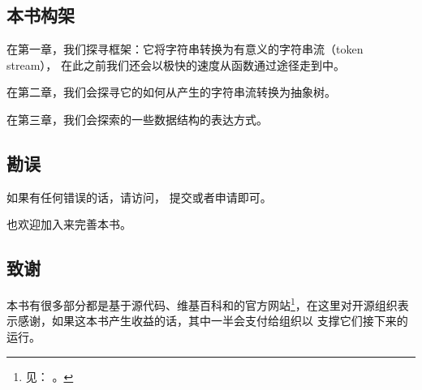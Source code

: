 \subsection*{本书构架}

在第一章，我们探寻框架：它将字符串转换为有意义的字符串流（token stream），
在此之前我们还会以极快的速度从函数通过途径走到中。

在第二章，我们会探寻它的如何从产生的字符串流转换为抽象树。

在第三章，我们会探索的一些数据结构的表达方式。


\subsection*{勘误}

如果有任何错误的话，请访问，
提交或者申请即可。

也欢迎加入来完善本书。


\subsection*{致谢}

本书有很多部分都是基于源代码、维基百科和的官方网站\footnote{见：%
。}，在这里对开源组织表示感谢，如果这本书产生收益的话，其中一半会支付给组织以
支撑它们接下来的运行。

